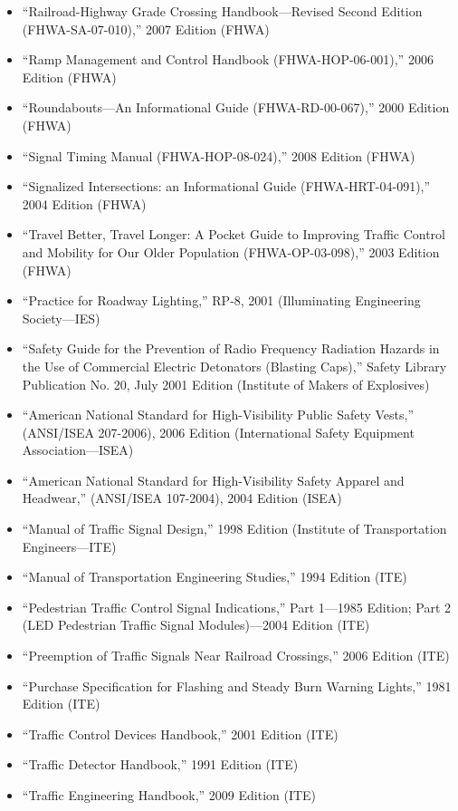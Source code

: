 \documentclass[9pt]{memoir}
\begin{document}
{\begin{itemize}
\item    ``Railroad-Highway Grade Crossing Handbook---Revised Second Edition (FHWA-SA-07-010),'' 2007 Edition (FHWA)
\item    ``Ramp Management and Control Handbook (FHWA-HOP-06-001),'' 2006 Edition (FHWA)
\item    ``Roundabouts---An Informational Guide (FHWA-RD-00-067),'' 2000 Edition (FHWA)
\item    ``Signal Timing Manual (FHWA-HOP-08-024),'' 2008 Edition (FHWA)
\item    ``Signalized Intersections: an Informational Guide (FHWA-HRT-04-091),'' 2004 Edition (FHWA)
\item    ``Travel Better, Travel Longer: A Pocket Guide to Improving Traffic Control and Mobility for Our Older Population (FHWA-OP-03-098),'' 2003 Edition (FHWA)
\item    ``Practice for Roadway Lighting,'' RP-8, 2001 (Illuminating Engineering Society---IES)
\item    ``Safety Guide for the Prevention of Radio Frequency Radiation Hazards in the Use of Commercial Electric Detonators (Blasting Caps),'' Safety Library Publication No. 20, July 2001 Edition (Institute of Makers of Explosives)
\item    ``American National Standard for High-Visibility Public Safety Vests,'' (ANSI/ISEA 207-2006), 2006 Edition (International Safety Equipment Association---ISEA)
\item    ``American National Standard for High-Visibility Safety Apparel and Headwear,'' (ANSI/ISEA 107-2004), 2004 Edition (ISEA)
\item    ``Manual of Traffic Signal Design,'' 1998 Edition (Institute of Transportation Engineers---ITE)
\item    ``Manual of Transportation Engineering Studies,'' 1994 Edition (ITE)
\item    ``Pedestrian Traffic Control Signal Indications,'' Part 1---1985 Edition; Part 2 (LED Pedestrian Traffic Signal Modules)---2004 Edition (ITE)
\item    ``Preemption of Traffic Signals Near Railroad Crossings,'' 2006 Edition (ITE)
\item    ``Purchase Specification for Flashing and Steady Burn Warning Lights,'' 1981 Edition (ITE)
\item    ``Traffic Control Devices Handbook,'' 2001 Edition (ITE)
\item    ``Traffic Detector Handbook,'' 1991 Edition (ITE)
\item    ``Traffic Engineering Handbook,'' 2009 Edition (ITE)

\end{itemize}}
\end{document}

